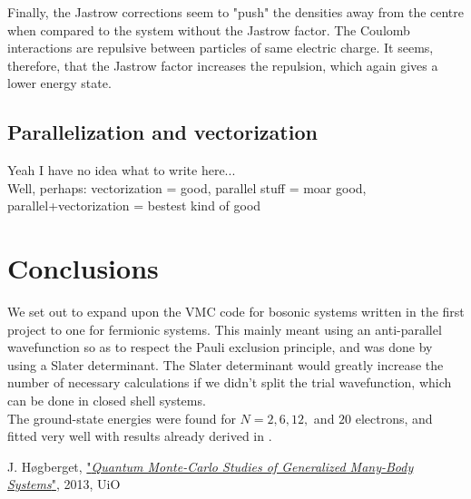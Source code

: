 \documentclass[english, a4paper]{article}
\begin{document}
	Finally, the Jastrow corrections seem to "push" the densities away from the centre when compared to the system without the Jastrow factor. The Coulomb interactions are repulsive between particles of same electric charge. It seems, therefore, that the Jastrow factor increases the repulsion, which again gives a lower energy state.
	
	\subsection{Parallelization and vectorization}
	Yeah I have no idea what to write here...\\
	
	Well, perhaps: vectorization = good, parallel stuff = moar good, parallel+vectorization = bestest kind of good
	
	\section{Conclusions}
	We set out to expand upon the VMC code for bosonic systems written in the first project to one for fermionic systems. This mainly meant using an anti-parallel wavefunction so as to respect the Pauli exclusion principle, and was done by using a Slater determinant. The Slater determinant would greatly increase the number of necessary calculations if we didn't split the trial wavefunction, which can be done in closed shell systems.\\
	The ground-state energies were found for $N=2,6,12,$ and $20$ electrons, and fitted very well with results already derived in \cite{H_Msc}.
	
	
	\begin{thebibliography}{9}
		J. Høgberget, \href{https://www.duo.uio.no/handle/10852/37167}{"\emph{Quantum Monte-Carlo Studies of Generalized Many-Body Systems}"}, 2013, UiO
	\end{thebibliography}
	
\end{document}

